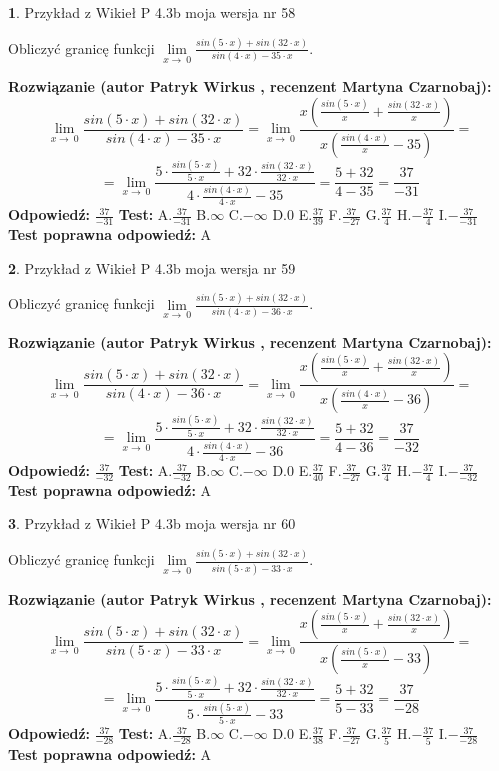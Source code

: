 \documentclass[12pt, a4paper]{article}
\theoremstyle{definition} %
\newtheorem{zad}{}
\newcommand{\zadStart}[1]{\begin{zad}#1\newline}
\newcommand{\zadStop}{\end{zad}}
\newcommand{\rozwStart}[2]{\noindent \textbf{Rozwiązanie (autor #1 , recenzent #2): }\newline}
\newcommand{\rozwStop}{\newline}
\newcommand{\odpStart}{\noindent \textbf{Odpowiedź:}\newline}
\newcommand{\odpStop}{\newline}
\newcommand{\testStart}{\noindent \textbf{Test:}\newline}
\newcommand{\testStop}{\newline}
\newcommand{\kluczStart}{\noindent \textbf{Test poprawna odpowiedź:}\newline}
\newcommand{\kluczStop}{\newline}
\begin{document}
\zadStart{Przykład z Wikieł P 4.3b moja wersja nr 58}


Obliczyć granicę funkcji $\lim\limits_{x\to\ 0}\frac{sin(5 \cdot x)+sin(32 \cdot x)}{sin(4 \cdot x)-35 \cdot x}$.
\zadStop
\rozwStart{Patryk Wirkus}{Martyna Czarnobaj}
$$\lim\limits_{x\to\ 0}\frac{sin(5 \cdot x)+sin(32 \cdot x)}{sin(4 \cdot x)-35 \cdot x}=\lim\limits_{x\to\ 0}\frac{x(\frac{sin(5 \cdot x)}{x}+\frac{sin(32 \cdot x)}{x})}{x(\frac{sin(4 \cdot x)}{x}-35)}=$$
$$=\lim\limits_{x\to\ 0}\frac{5 \cdot \frac{sin(5 \cdot x)}{5 \cdot x}+32 \cdot \frac{sin(32 \cdot x)}{32 \cdot x}}{4 \cdot \frac{sin(4 \cdot x)}{4 \cdot x}-35}=\frac{5+32}{4-35} = \frac{37}{-31}$$
\rozwStop
\odpStart
$\frac{37}{-31}$
\odpStop
\testStart
A.$\frac{37}{-31}$
B.$\infty$
C.$-\infty$
D.$0$
E.$\frac{37}{39}$
F.$\frac{37}{-27}$
G.$\frac{37}{4}$
H.$-\frac{37}{4}$
I.$-\frac{37}{-31}$
\testStop
\kluczStart
A
\kluczStop



\zadStart{Przykład z Wikieł P 4.3b moja wersja nr 59}


Obliczyć granicę funkcji $\lim\limits_{x\to\ 0}\frac{sin(5 \cdot x)+sin(32 \cdot x)}{sin(4 \cdot x)-36 \cdot x}$.
\zadStop
\rozwStart{Patryk Wirkus}{Martyna Czarnobaj}
$$\lim\limits_{x\to\ 0}\frac{sin(5 \cdot x)+sin(32 \cdot x)}{sin(4 \cdot x)-36 \cdot x}=\lim\limits_{x\to\ 0}\frac{x(\frac{sin(5 \cdot x)}{x}+\frac{sin(32 \cdot x)}{x})}{x(\frac{sin(4 \cdot x)}{x}-36)}=$$
$$=\lim\limits_{x\to\ 0}\frac{5 \cdot \frac{sin(5 \cdot x)}{5 \cdot x}+32 \cdot \frac{sin(32 \cdot x)}{32 \cdot x}}{4 \cdot \frac{sin(4 \cdot x)}{4 \cdot x}-36}=\frac{5+32}{4-36} = \frac{37}{-32}$$
\rozwStop
\odpStart
$\frac{37}{-32}$
\odpStop
\testStart
A.$\frac{37}{-32}$
B.$\infty$
C.$-\infty$
D.$0$
E.$\frac{37}{40}$
F.$\frac{37}{-27}$
G.$\frac{37}{4}$
H.$-\frac{37}{4}$
I.$-\frac{37}{-32}$
\testStop
\kluczStart
A
\kluczStop



\zadStart{Przykład z Wikieł P 4.3b moja wersja nr 60}


Obliczyć granicę funkcji $\lim\limits_{x\to\ 0}\frac{sin(5 \cdot x)+sin(32 \cdot x)}{sin(5 \cdot x)-33 \cdot x}$.
\zadStop
\rozwStart{Patryk Wirkus}{Martyna Czarnobaj}
$$\lim\limits_{x\to\ 0}\frac{sin(5 \cdot x)+sin(32 \cdot x)}{sin(5 \cdot x)-33 \cdot x}=\lim\limits_{x\to\ 0}\frac{x(\frac{sin(5 \cdot x)}{x}+\frac{sin(32 \cdot x)}{x})}{x(\frac{sin(5 \cdot x)}{x}-33)}=$$
$$=\lim\limits_{x\to\ 0}\frac{5 \cdot \frac{sin(5 \cdot x)}{5 \cdot x}+32 \cdot \frac{sin(32 \cdot x)}{32 \cdot x}}{5 \cdot \frac{sin(5 \cdot x)}{5 \cdot x}-33}=\frac{5+32}{5-33} = \frac{37}{-28}$$
\rozwStop
\odpStart
$\frac{37}{-28}$
\odpStop
\testStart
A.$\frac{37}{-28}$
B.$\infty$
C.$-\infty$
D.$0$
E.$\frac{37}{38}$
F.$\frac{37}{-27}$
G.$\frac{37}{5}$
H.$-\frac{37}{5}$
I.$-\frac{37}{-28}$
\testStop
\kluczStart
A
\kluczStop
\end{document}
